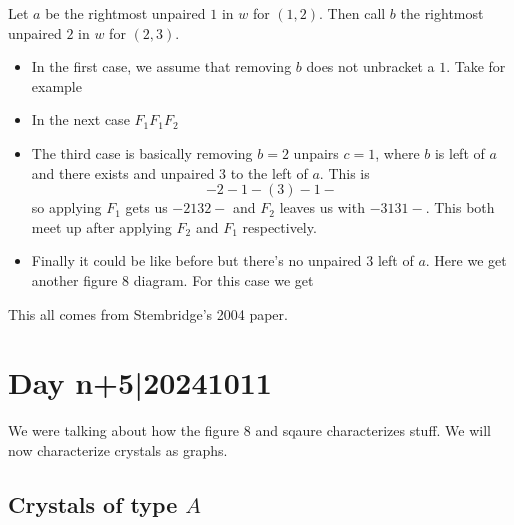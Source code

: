 \documentclass[12pt]{memoir}
\begin{document}
\begin{ptcbp}
    Let $a$ be the rightmost unpaired $1$ in $w$ for $(1,2)$. Then call $b$ the rightmost unpaired $2$ in $w$ for $(2,3)$.
    \begin{itemize}
        \item In the first case, we assume that removing $b$ does not unbracket a $1$. Take for example
        \item In the next case $F_1F_1F_2$
        \item The third case is basically removing $b=2$ unpairs $c=1$, where $b$ is left of $a$ and there exists and unpaired $3$ to the left of $a$. This is 
        $$-2-1-(3)-1-$$
        so applying $F_1$ gets us $-2132-$ and $F_2$ leaves us with $-3131-$. This both meet up after applying $F_2$ and $F_1$ respectively.
        \item Finally it could be like before but there's no unpaired $3$ left of $a$. Here we get another figure 8 diagram. For this case we get 
    \end{itemize}
    

\end{ptcbp}

This all comes from Stembridge's 2004 paper. 

\section{Day n+5|20241011}

We were talking about how the figure 8 and sqaure characterizes stuff. We will now characterize crystals as graphs. 

\subsection{Crystals of type $A$}
\end{document}
